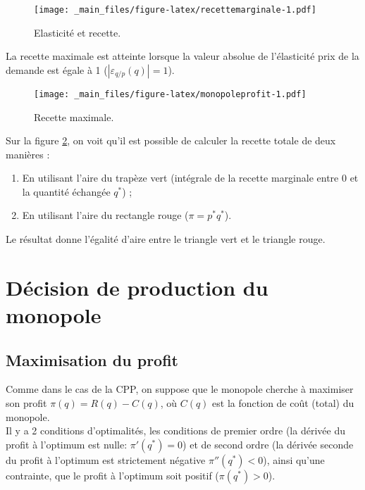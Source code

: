 \documentclass[
  a4paper,
]{book}
\providecommand{\tightlist}{%
  \setlength{\itemsep}{0pt}\setlength{\parskip}{0pt}}
\theoremstyle{definition}
\theoremstyle{definition}
\theoremstyle{definition}
\theoremstyle{definition}
\theoremstyle{remark}
\begin{document}
\begin{figure}
\centering
\texttt{[image: \_main\_files/figure-latex/recettemarginale-1.pdf]}
\caption{\label{fig:recettemarginale}Elasticité et recette.}
\end{figure}

La recette maximale est atteinte lorsque la valeur absolue de l'élasticité prix de la demande est égale à 1 (\(|\varepsilon_{q/p}(q)|=1\)).

\begin{figure}
\centering
\texttt{[image: \_main\_files/figure-latex/monopoleprofit-1.pdf]}
\caption{\label{fig:monopoleprofit}Recette maximale.}
\end{figure}

Sur la figure \ref{fig:monopoleprofit}, on voit qu'il est possible de calculer la recette totale de deux manières :

\begin{enumerate}
\def\labelenumi{\arabic{enumi}.}
\tightlist
\item
  En utilisant l'aire du trapèze vert (intégrale de la recette marginale entre 0 et la quantité échangée \(q^*\)) ;
\item
  En utilisant l'aire du rectangle rouge (\(\pi=p^* q^*\)).
\end{enumerate}

Le résultat donne l'égalité d'aire entre le triangle vert et le triangle rouge.

\hypertarget{duxe9cision-de-production-du-monopole}{%
\section{Décision de production du monopole}\label{duxe9cision-de-production-du-monopole}}

\hypertarget{maximisation-du-profit}{%
\subsection{Maximisation du profit}\label{maximisation-du-profit}}

Comme dans le cas de la CPP, on suppose que le monopole cherche à maximiser son profit \(\pi(q)=R(q)-C(q)\), où \(C(q)\) est la fonction de coût (total) du monopole.\\
Il y a 2 conditions d'optimalités, les conditions de premier ordre (la dérivée du profit à l'optimum est nulle: \(\pi'(q^*)=0\)) et de second ordre (la dérivée seconde du profit à l'optimum est strictement négative \(\pi''(q^*)<0\)), ainsi qu'une contrainte, que le profit à l'optimum soit positif (\(\pi(q^*)>0\)).
\end{document}

